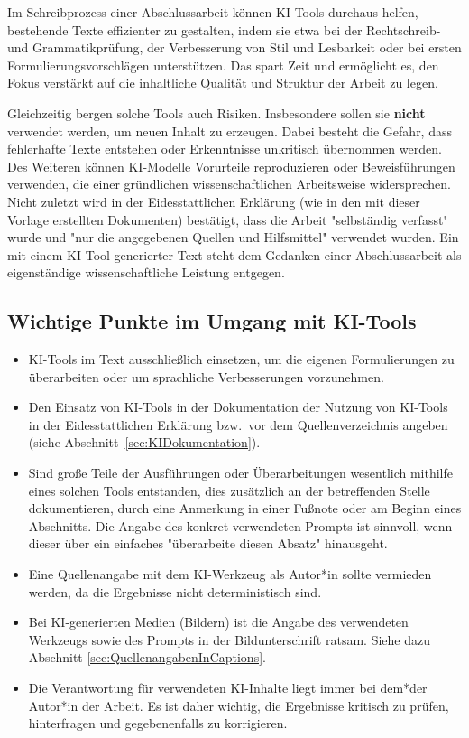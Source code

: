 Im Schreibprozess einer Abschlussarbeit können KI-Tools durchaus helfen,
bestehende Texte effizienter zu gestalten, indem sie etwa bei der Rechtschreib-
und Grammatikprüfung, der Verbesserung von Stil und Lesbarkeit oder bei ersten
Formulierungsvorschlägen unterstützen. Das spart Zeit und ermöglicht es, den
Fokus verstärkt auf die inhaltliche Qualität und Struktur der Arbeit zu legen.

Gleichzeitig bergen solche Tools auch Risiken. Insbesondere sollen sie
\textbf{nicht} verwendet werden, um neuen Inhalt zu erzeugen. Dabei besteht die
Gefahr, dass fehlerhafte Texte entstehen oder Erkenntnisse unkritisch
übernommen werden. Des Weiteren können KI-Modelle Vorurteile reproduzieren oder
Beweisführungen verwenden, die einer gründlichen wissenschaftlichen Arbeitsweise
widersprechen. Nicht zuletzt wird in der Eidesstattlichen Erklärung (wie in
den mit dieser Vorlage erstellten Dokumenten) bestätigt, dass die Arbeit
"selbständig verfasst" wurde und "nur die angegebenen Quellen und Hilfsmittel"
verwendet wurden. Ein mit einem KI-Tool generierter Text steht dem Gedanken
einer Abschlussarbeit als eigenständige wissenschaftliche Leistung entgegen.

\subsection{Wichtige Punkte im Umgang mit KI-Tools}

\begin{itemize}
    \item KI-Tools im Text ausschließlich einsetzen, um die eigenen
    Formulierungen zu überarbeiten oder um sprachliche Verbesserungen
    vorzunehmen.
    \item Den Einsatz von KI-Tools in der Dokumentation der Nutzung von
    KI-Tools in der Eidesstattlichen Erklärung bzw.\ vor dem Quellenverzeichnis
    angeben (siehe
    Abschnitt~\ref{sec:KIDokumentation}).
    \item Sind große Teile der Ausführungen oder Überarbeitungen wesentlich
    mithilfe eines solchen Tools entstanden, dies zusätzlich an der
    betreffenden Stelle dokumentieren, \zB durch eine Anmerkung in einer
    Fußnote oder am Beginn eines Abschnitts. Die Angabe des konkret
    verwendeten Prompts ist sinnvoll, wenn dieser über ein einfaches
    "überarbeite diesen Absatz" hinausgeht.
    \item Eine Quellenangabe mit dem KI-Werkzeug als Autor*in sollte vermieden
    werden, da die Ergebnisse nicht deterministisch sind.
    \item Bei KI-generierten Medien (\zB Bildern) ist die Angabe des
    verwendeten Werkzeugs sowie des Prompts in der Bildunterschrift ratsam.
    Siehe dazu Abschnitt \ref{sec:QuellenangabenInCaptions}.
    \item Die Verantwortung für verwendeten KI-Inhalte liegt immer bei dem*der
    Autor*in der Arbeit. Es ist daher wichtig, die Ergebnisse kritisch zu
    prüfen, hinterfragen und gegebenenfalls zu korrigieren.
\end{itemize}

